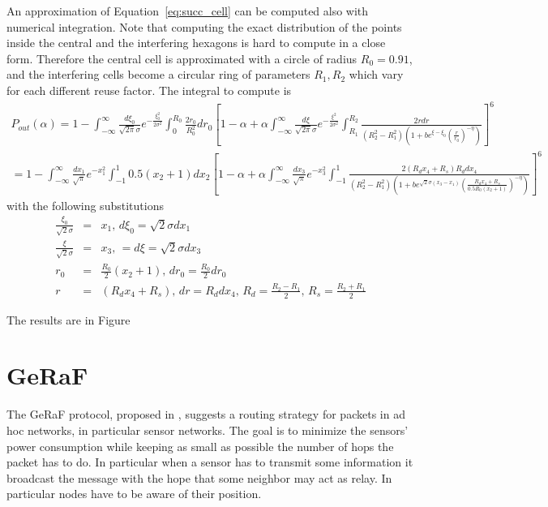 \documentclass[10pt]{article}
\begin{document}
An approximation of Equation~\eqref{eq:succ_cell} can be computed also with numerical integration. Note that computing the exact distribution of the points inside the central and the interfering hexagons is hard to compute in a close form. Therefore the central cell is approximated with a circle of radius $R_0 = 0.91$, and the interfering cells become a circular ring of parameters $R_1, R_2$ which vary for each different reuse factor. 
The integral to compute is 
\begin{eqnarray}
P_{out}(\alpha)  =   1 - \int_{-\infty}^{\infty} \frac{d\xi_0}{\sqrt{2\pi}\sigma} e^{-\frac{\xi_0^2}{2\sigma^2}} \int_0^{R_0} \frac{2 r_0}{R_0^2} dr_0 \left[
  1 - \alpha + \alpha \int_{-\infty}^{\infty} 
  \frac{d\xi}{\sqrt{2\pi}\sigma} 
  e^{-\frac{\xi^2}{2\sigma^2}} 
  \int_{R_1}^{R_2} 
  \frac{2r dr}{(R_2^2-R_1^2)\left(1 + b e^{\xi - \xi_0} \left( \frac{r}{r_0} \right)^{-\eta}\right)}
  \right]^{6}
  \\
   =  1 - \int_{-\infty}^{\infty} \frac{dx_1}{\sqrt{\pi}} e^{-x_1^2} \int_{-1}^{1} 0.5(x_2+1) dx_2 \left[
  1 - \alpha + \alpha \int_{-\infty}^{\infty} 
  \frac{dx_3}{\sqrt{\pi}} 
  e^{-x_3^2} 
  \int_{-1}^{1} 
  \frac{2(R_dx_4 + R_s) R_d dx_4}{(R_2^2-R_1^2)\left(1 + b e^{\sqrt{2}\sigma(x_3 - x_1)} 
  \left( \frac{R_dx_4 + R_s}{0.5R_0(x_2+1)} \right)^{-\eta}\right)}
  \right]^{6}
\end{eqnarray}
with the following substitutions
\begin{eqnarray*}
  \frac{\xi_0}{\sqrt{2}\sigma} &=& x_1, \, d\xi_0 = \sqrt{2}\sigma dx_1 \\ 
  \frac{\xi}{\sqrt{2}\sigma} &=& x_3, \, = d\xi = \sqrt{2}\sigma dx_3  \\
  r_0 &=& \frac{R_0}{2}(x_2 + 1), \, dr_0 = \frac{R_0}{2} dr_0\\
  r &=& (R_d x_4 + R_s), \, dr = R_d dx_4, \, R_d = \frac{R_2 - R_1}{2}, \, R_s = \frac{R_2 + R_1}{2}
\end{eqnarray*}

The results are in Figure

\section*{GeRaF}
The GeRaF protocol, proposed in \cite{tmc}, suggests a routing strategy for packets in ad hoc networks, in particular sensor networks. The goal is to minimize the sensors' power consumption while keeping as small as possible the number of hops the packet has to do. In particular when a sensor has to transmit some information it broadcast the message with the hope that some neighbor may act as relay. In particular nodes have to be aware of their position. 
\end{document}

